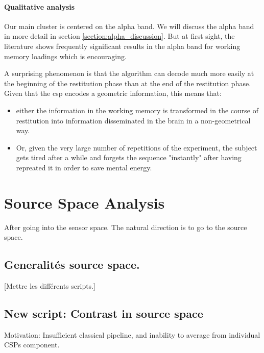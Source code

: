 \paragraph{Qualitative analysis}

Our main cluster is centered on the alpha band. We will discuss the alpha band in more detail in section \ref{section:alpha_discussion}. But at first sight, the literature shows frequently significant results in the alpha band for working memory loadings \cite{obleser2012adverse} which is encouraging.

A surprising phenomenon is that the algorithm can decode much more easily at the beginning of the restitution phase than at the end of the restitution phase. Given that the csp encodes a geometric information, this means that:
\begin{itemize}
    \item either the information in the working memory is transformed in the course of restitution into information disseminated in the brain in a non-geometrical way.
    \item Or, given the very large number of repetitions of the experiment, the subject gets tired after a while and forgets the sequence "instantly" after having repreated it in order to save mental energy.
\end{itemize}

\section{Source Space Analysis}

After going into the sensor space. The natural direction is to go to the source space.

\subsection{Generalités source space.}

[Mettre les différents scripts.]

\subsection{New script: Contrast in source space}
Motivation: Insufficient classical pipeline, and inability to average from individual CSPs component.

